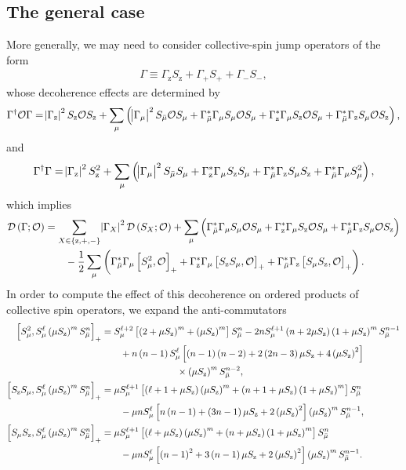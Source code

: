 \documentclass[aps,notitlepage,nofootinbib,11pt]{revtex4-1}
\newcommand{\f}[2]{\dfrac{#1}{#2}} %
\newcommand{\p}[1]{\left(#1\right)} %
\renewcommand{\sp}[1]{\left[#1\right]} %
\renewcommand{\set}[1]{\left\{#1\right\}} %
\newcommand{\D}{\mathcal{D}}
\renewcommand{\O}{\mathcal{O}}
\newcommand{\z}{\text{z}}
\newcommand{\bmu}{{\bar\mu}}
\newcommand{\1}{\mathds{1}}
\begin{document}
\subsection{The general case}
\label{sec:general_collective}

More generally, we may need to consider collective-spin jump operators
of the form
\begin{align}
  \Gamma \equiv \Gamma_\z S_\z + \Gamma_+ S_+ + \Gamma_- S_-,
\end{align}
whose decoherence effects are determined by
\begin{align}
  \Gamma^\dag \O \Gamma
  = \abs{\Gamma_\z}^2 S_\z \O S_\z
  + \sum_\mu \p{\abs{\Gamma_\mu}^2 S_\bmu \O S_\mu
    + \Gamma_\bmu^* \Gamma_\mu S_\mu \O S_\mu
    + \Gamma_\z^* \Gamma_\mu S_\z \O S_\mu
    + \Gamma_\bmu^* \Gamma_\z S_\mu \O S_\z},
\end{align}
and
\begin{align}
  \Gamma^\dag \Gamma
  = \abs{\Gamma_\z}^2 S_\z^2
  + \sum_\mu \p{\abs{\Gamma_\mu}^2 S_\bmu S_\mu
    + \Gamma_\z^*\Gamma_\mu S_\z S_\mu
    + \Gamma_\bmu^* \Gamma_\z S_\mu S_\z
    + \Gamma_\bmu^* \Gamma_\mu S_\mu^2},
\end{align}
which implies
\begin{align}
  \D\p{\Gamma;\O}
  &= \sum_{X\in\set{\z,+,-}} \abs{\Gamma_X}^2 \D\p{S_X;\O}
  + \sum_\mu \p{\Gamma_\bmu^* \Gamma_\mu S_\mu \O S_\mu
    + \Gamma_\z^* \Gamma_\mu S_\z \O S_\mu
    + \Gamma_\bmu^* \Gamma_\z S_\mu \O S_\z}
  \notag \\
  &\qquad -\f12 \sum_\mu\p{\Gamma_\bmu^* \Gamma_\mu \sp{S_\mu^2, \O}_+
    + \Gamma_\z^*\Gamma_\mu \sp{S_\z S_\mu, \O}_+
    + \Gamma_\bmu^* \Gamma_\z \sp{S_\mu S_\z, \O}_+}.
\end{align}
In order to compute the effect of this decoherence on ordered products
of collective spin operators, we expand the anti-commutators
\begin{align}
  \sp{S_\mu^2, S_\mu^\ell \p{\mu S_\z}^m S_\bmu^n}_+
  &= S_\mu^{\ell+2} \sp{\p{2+\mu S_\z}^m+\p{\mu S_\z}^m} S_\bmu^n
  - 2n S_\mu^{\ell+1} \p{n+2\mu S_\z} \p{1+\mu S_\z}^m S_\bmu^{n-1}
  \notag \\
  &\qquad + n\p{n-1} S_\mu^\ell \sp{\p{n-1}\p{n-2}
    + 2\p{2n-3}\mu S_\z + 4\p{\mu S_\z}^2} \notag \\
  &\qquad\qquad\qquad\qquad \times \p{\mu S_\z}^m S_\bmu^{n-2},
  \allowdisplaybreaks \\
  \sp{S_\z S_\mu, S_\mu^\ell \p{\mu S_\z}^m S_\bmu^n}_+
  &= \mu S_\mu^{\ell+1} \sp{\p{\ell+1+\mu S_\z}\p{\mu S_\z}^m
    + \p{n+1+\mu S_\z} \p{1+\mu S_\z}^m } S_\bmu^n \notag \\
  &\qquad - \mu n S_\mu^\ell \sp{n \p{n-1}
    + \p{3n-1}\mu S_\z + 2\p{\mu S_\z}^2} \p{\mu S_\z}^m S_\bmu^{n-1},
  \allowdisplaybreaks \\
  \sp{S_\mu S_\z, S_\mu^\ell \p{\mu S_\z}^m S_\bmu^n}_+
  &= \mu S_\mu^{\ell+1} \sp{\p{\ell+\mu S_\z}\p{\mu S_\z}^m
    + \p{n+\mu S_\z} \p{1+\mu S_\z}^m} S_\bmu^n \notag \\
  &\qquad - \mu n S_\mu^\ell \sp{\p{n-1}^2
    + 3\p{n-1}\mu S_\z + 2\p{\mu S_\z}^2} \p{\mu S_\z}^m S_\bmu^{n-1}.
\end{align}
\end{document}

